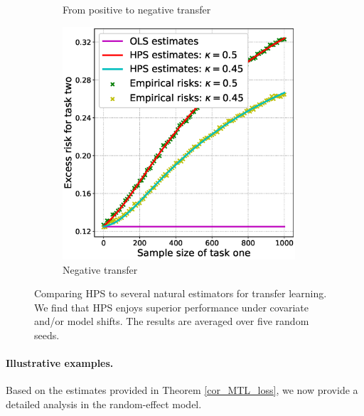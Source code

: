 \begin{figure}[!t]
\begin{subfigure}[b]{0.33\textwidth}
		\caption{From positive to negative transfer}
		\label{fig_sec5_covariate}
	\end{subfigure}\hfill%
	\begin{subfigure}[b]{0.33\textwidth}
		\centering
		\includegraphics[width=0.95\textwidth]{figures/model_shift_negative.eps}
		\caption{Negative transfer}
		\label{fig_sec5_covariate}
	\end{subfigure}	
	\caption{Comparing HPS to several natural estimators for transfer learning. We find that HPS enjoys superior performance under covariate and/or model shifts. The results are averaged over five random seeds.}
	\label{fig_sec51}
\end{figure}

\paragraph{Illustrative examples.}
Based on the estimates provided in Theorem \ref{cor_MTL_loss}, we now provide a detailed analysis in the random-effect model.
\begin{claim}

\end{claim}

